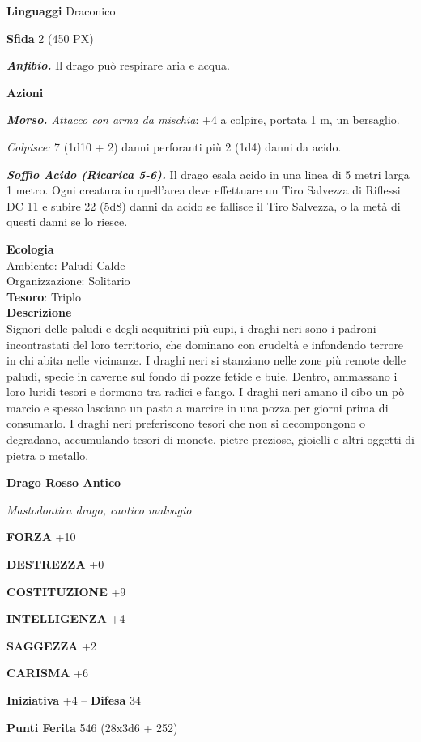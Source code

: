\begin{multicols}{2}
\textbf{Linguaggi} Draconico

\textbf{Sfida} 2 (450 PX)

\textit{\textbf{Anfibio.}} Il drago può respirare aria e acqua.

\textbf{Azioni}

\textit{\textbf{Morso.} Attacco con arma da mischia}: +4 a colpire, portata 1 m, un bersaglio.

\textit{Colpisce:} 7 (1d10 + 2) danni perforanti più 2 (1d4) danni da acido.

\textit{\textbf{Soffio Acido (Ricarica 5-6).}} Il drago esala acido in una linea di 5 metri larga 1 metro. Ogni creatura in quell'area deve effettuare un Tiro Salvezza di Riflessi DC 11 e subire 22 (5d8) danni da acido se fallisce il Tiro Salvezza, o la metà di questi danni se lo riesce.

\textbf{Ecologia}\\
Ambiente: Paludi Calde\\
Organizzazione: Solitario\\
\textbf{Tesoro}: Triplo\\
\textbf{Descrizione}\\
Signori delle paludi e degli acquitrini più cupi, i draghi neri sono i padroni incontrastati del loro territorio, che dominano con crudeltà e infondendo terrore in chi abita nelle vicinanze. I draghi neri si stanziano nelle zone più remote delle paludi, specie in caverne sul fondo di pozze fetide e buie. Dentro, ammassano i loro luridi tesori e dormono tra radici e fango. I draghi neri amano il cibo un pò marcio e spesso lasciano un pasto a marcire in una pozza per giorni prima di consumarlo. I draghi neri preferiscono tesori che non si decompongono o degradano, accumulando tesori di monete, pietre preziose, gioielli e altri oggetti di pietra o metallo.

\medskip{}\textbf{Drago Rosso Antico}

\textit{Mastodontica drago, caotico malvagio}

\textbf{FORZA} +10

\textbf{DESTREZZA} +0

\textbf{COSTITUZIONE} +9

\textbf{INTELLIGENZA} +4

\textbf{SAGGEZZA} +2

\textbf{CARISMA} +6

\textbf{Iniziativa} +4 -- \textbf{Difesa} 34

\textbf{Punti Ferita} 546 (28x3d6 + 252)


\end{multicols}
